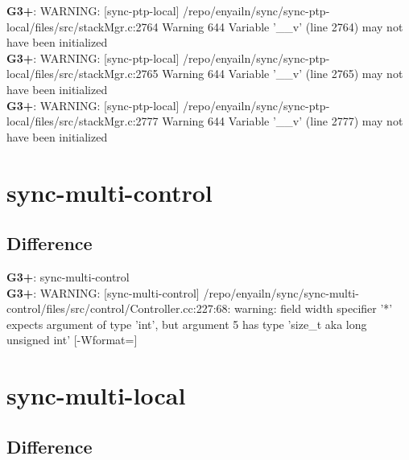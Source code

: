 \documentclass[12pt,twoside]{article}
\begin{document}
\textbf{G3+}: WARNING: [sync-ptp-local] /repo/enyailn/sync/sync-ptp-local/files/src/stackMgr.c:2764 Warning 644 Variable '\_\_v' (line 2764) may not have been initialized\\ 
\textbf{G3+}: WARNING: [sync-ptp-local] /repo/enyailn/sync/sync-ptp-local/files/src/stackMgr.c:2765 Warning 644 Variable '\_\_v' (line 2765) may not have been initialized\\ 
\textbf{G3+}: WARNING: [sync-ptp-local] /repo/enyailn/sync/sync-ptp-local/files/src/stackMgr.c:2777 Warning 644 Variable '\_\_v' (line 2777) may not have been initialized\\ 
  
\section{sync-multi-control} 
\subsection{Difference} 
  
\textbf{G3+}: sync-multi-control\\ 
\textbf{G3+}: WARNING: [sync-multi-control] /repo/enyailn/sync/sync-multi-control/files/src/control/Controller.cc:227:68: warning: field width specifier '*' expects argument of type 'int', but argument 5 has type 'size\_t {aka long unsigned int}' [-Wformat=]\\ 
  
\section{sync-multi-local} 
\subsection{Difference} 
  
\end{document}
